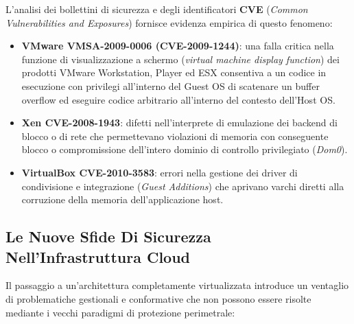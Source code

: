 \documentclass[11pt, a4paper]{article}
\begin{document}

L'analisi dei bollettini di sicurezza e degli identificatori \textbf{CVE} (\emph{Common Vulnerabilities and Exposures}) fornisce evidenza empirica di questo fenomeno:
\begin{itemize}
    \item \textbf{VMware VMSA-2009-0006 (CVE-2009-1244)}: una falla critica nella funzione di visualizzazione a schermo (\emph{virtual machine display function}) dei prodotti VMware Workstation, Player ed ESX consentiva a un codice in esecuzione con privilegi all'interno del Guest OS di scatenare un buffer overflow ed eseguire codice arbitrario all'interno del contesto dell'Host OS.
    \item \textbf{Xen CVE-2008-1943}: difetti nell'interprete di emulazione dei backend di blocco o di rete che permettevano violazioni di memoria con conseguente blocco o compromissione dell'intero dominio di controllo privilegiato (\emph{Dom0}).
    \item \textbf{VirtualBox CVE-2010-3583}: errori nella gestione dei driver di condivisione e integrazione (\emph{Guest Additions}) che aprivano varchi diretti alla corruzione della memoria dell'applicazione host.
\end{itemize}

\subsection{Le Nuove Sfide Di Sicurezza Nell'Infrastruttura Cloud}
Il passaggio a un'architettura completamente virtualizzata introduce un ventaglio di problematiche gestionali e conformative che non possono essere risolte mediante i vecchi paradigmi di protezione perimetrale:
\end{document}

